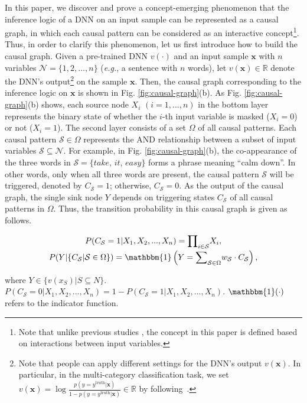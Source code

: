 \documentclass[10pt,twocolumn,letterpaper]{article}
\begin{document}
In this paper, we discover and prove a concept-emerging phenomenon that the inference logic of a DNN on an input sample can be represented as a causal graph, in which each causal pattern can be considered as an interactive concept\footnote{Note that unlike previous studies \cite{kim2019automatic}, the concept in this paper is defined based on interactions between input variables.}. Thus, in order to clarify this phenomenon, let us first introduce how to build the causal graph.
Given a pre-trained DNN {\small$v(\cdot)$} and an input sample {\small$\boldsymbol{x}$} with {\small$n$} variables {\small$\mathcal{N}=\{1,2,\ldots,n\}$} (\emph{e.g.}, a sentence with {\small$n$} words), let {\small$v(\boldsymbol{x})\in\mathbb{R}$} denote the DNN's output\footnote{Note that people can apply different settings for the DNN's output {\scriptsize$v(\boldsymbol{x})$}. In particular, in the multi-category classification task, we set {\scriptsize$v(\boldsymbol{x})=\log\frac{p(y=y^{\text{truth}}|\boldsymbol{x})}{1-p(y=y^{\text{truth}}|\boldsymbol{x})}\in\mathbb{R}$} by following~\cite{deng2022discovering}.\label{footnote:v-S}} on the sample {\small$\boldsymbol{x}$}. Then, the causal graph corresponding to the inference logic on {\small$\boldsymbol{x}$} is shown in Fig. \ref{fig:causal-graph}(b).
As Fig. \ref{fig:causal-graph}(b) shows, each source node {\small$X_i$} {\small$(i=1,...,n)$} in the bottom layer represents the binary state of whether the {\small$i$}-th input variable is masked ({\small$X_i=0$}) or not ({\small$X_i=1$}).
The second layer consists of a set {\small$\Omega$} of all causal patterns. Each causal pattern {\small$\mathcal{S}\in\Omega$} represents the AND relationship between a subset of input variables {\small$\mathcal{S}\!\subseteq\!\mathcal{N}$}.
For example, in Fig. \ref{fig:causal-graph}(b), the co-appearance of the three words in {\small$\mathcal{S}=\{\textit{take, it, easy}\}$} forms a phrase meaning ``calm down''.
In other words, only when all three words are present, the causal pattern {\small$\mathcal{S}$} will be triggered, denoted by {\small$C_{\mathcal{S}}=1$}; otherwise, {\small$C_{\mathcal{S}}=0$}.
As the output of the causal graph, the single sink node {\small$Y$} depends on triggering states {\small$C_{\mathcal{S}}$} of all causal patterns in  {\small$\Omega$}.
Thus, the transition probability in this causal graph is given as follows.

\begin{small}
\begin{equation}
\begin{gathered}
    P(C_{\mathcal{S}}=1|X_1,X_2,...,X_n)={\prod}_{i\in\mathcal{S}} X_i,
    \\[-2pt]
    P(Y|\{C_{\mathcal{S}}|\mathcal{S}\in\Omega\})=\mathbbm{1}\left(Y={\sum}_{\mathcal{S}\in\Omega}  w_{\mathcal{S}}\cdot C_{\mathcal{S}}\right),
    \label{eq:transition-probability}
\end{gathered}
\end{equation}
\end{small}
\!\!where {\small$Y\in\{v(x_S)|S\subseteq N\}$}.
{\small$P(C_{\mathcal{S}}\!=\!0|X_1,X_2,...,X_n)\!=\!1\!-\!P(C_{\mathcal{S}}\!=\!1|X_1,X_2,...,X_n)$}.
{\small$\mathbbm{1}(\cdot)$} refers to the indicator function.
\end{document}
